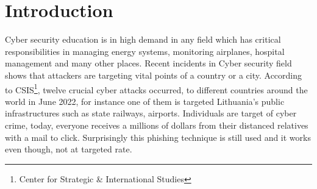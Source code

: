 
\chapter{Introduction}\label{chapter:introduction}

Cyber security education is in high demand in any field which has critical responsibilities in managing energy systems, monitoring airplanes, hospital management and many other places. Recent incidents in Cyber security field shows that attackers are targeting vital points of a country or a city. According to CSIS\footnote{Center for Strategic & International Studies}, twelve crucial cyber attacks occurred, to different countries around the world in June 2022, for instance one of them is targeted Lithuania's public infrastructures such as state railways, airports.\cite{cyberincidents} Individuals are target of cyber crime, today, everyone receives a millions of dollars from their distanced relatives with a mail to click. Surprisingly this phishing technique is still used and it works even though, not at targeted rate. 


